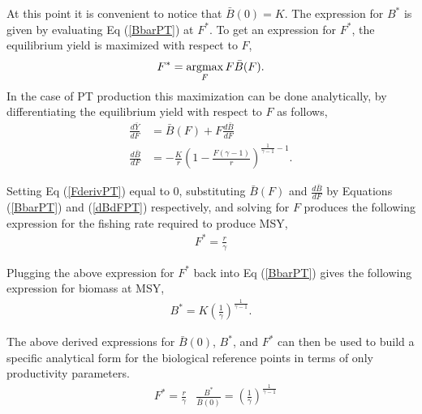 \documentclass[12pt]{article}
\newcommand{\argmax}{\operatornamewithlimits{argmax}}
\begin{document}
At this point it is convenient to notice that $\bar B(0)=K$. The expression for 
$B^*$ is given by evaluating Eq (\ref{BbarPT}) at $F^*$.
%
To get an expression for $F^*$, the equilibrium yield is maximized with respect to $F$,
\begin{equation}
F^* = \argmax_F F\bar B(F).
\end{equation}
%
In the case of PT production this maximization can be done analytically, %
by differentiating the equilibrium yield with respect to $F$ as follows,
%
\begin{align}
\frac{d \bar{Y}}{dF} &= \bar B(F) + F \frac{d \bar B}{dF} \label{FderivPT}\\
\frac{d \bar B}{dF} &= -\frac{K}{r}\left(1-\frac{F(\gamma-1)}{r}\right)^{\frac{1}{\gamma-1}-1}\label{dBdFPT}.
\end{align}

Setting Eq (\ref{FderivPT}) equal to 0, substituting $\bar B(F)$ and 
$\frac{d \bar B}{dF}$ by Equations (\ref{BbarPT}) and (\ref{dBdFPT}) respectively, 
and solving for $F$ produces the following expression for the fishing 
rate required to produce MSY, %
%
\begin{align}
F^* = \frac{r}{\gamma}%
\end{align}

%
Plugging the above expression for $F^*$ back into Eq (\ref{BbarPT}) gives the 
following expression for biomass at MSY, 
\begin{align}
B^* = K\left(\frac{1}{\gamma}\right)^{\frac{1}{\gamma-1}} \label{BmsyPT}. %
\end{align}

%
The above derived expressions for $\bar B(0)$, $B^*$, and $F^*$ can then be used to 
build a specific analytical form for the biological reference points in terms of only 
productivity parameters.
\begin{align}\label{ptRP}
&F^* = \frac{r}{\gamma}
&\frac{B^*}{\bar B(0)} = \left(\frac{1}{\gamma}\right)^{\frac{1}{\gamma-1}}
\end{align}
\end{document}
